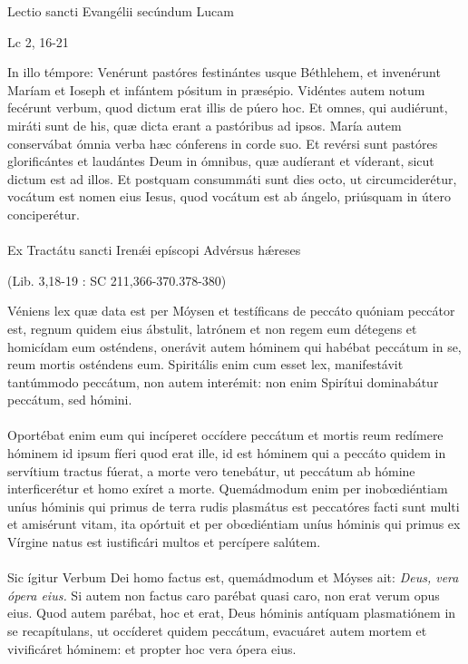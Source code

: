 \documentclass[options]{article}
\begin{document}
		Lectio sancti Evangélii secúndum Lucam
	\begin{flushright}
		Lc 2, 16-21
	\end{flushright}
In illo témpore:
Venérunt pastóres festinántes usque Béthlehem, et invenérunt Maríam et Ioseph et infántem pósitum in præsépio.
Vidéntes autem notum fecérunt verbum, quod dictum erat illis de púero hoc. Et omnes, qui audiérunt, miráti sunt de his, quæ dicta erant a pastóribus ad ipsos. María autem conservábat ómnia verba hæc cónferens in corde suo.
Et revérsi sunt pastóres glorificántes et laudántes Deum in ómnibus, quæ audíerant et víderant, sicut dictum est ad illos.
Et postquam consummáti sunt dies octo, ut circumciderétur, vocátum est nomen eius Iesus, quod vocátum est ab ángelo, priúsquam in útero conciperétur.\\
\\
Ex Tractátu sancti Iren\'{æ}i epíscopi Advérsus h\'{æ}reses
\begin{flushright}
	(Lib. 3,18-19 : SC 211,366-370.378-380)
\end{flushright}
Véniens lex quæ data est per Móysen et testíficans de peccáto quóniam peccátor est, regnum quidem eius ábstulit, latrónem et non regem eum détegens et homicídam eum osténdens, onerávit autem hóminem qui habébat peccátum in se, reum mortis osténdens eum. Spiritális enim cum esset lex, manifestávit tantúmmodo peccátum, non autem interémit: non enim Spirítui dominabátur peccátum, sed hómini.\\
\\
Oportébat enim eum qui incíperet occídere peccátum et mortis reum redímere hóminem id ipsum fíeri quod erat ille, id est hóminem qui a peccáto quidem in servítium tractus fúerat, a morte vero tenebátur, ut peccátum ab hómine interficerétur et homo exíret a morte. Quemádmodum enim per inobœdiéntiam uníus hóminis qui primus de terra rudis plasmátus est peccatóres facti sunt multi et amisérunt vitam, ita opórtuit et per obœdiéntiam uníus hóminis qui primus ex Vírgine natus est iustificári multos et percípere salútem.\\
\\
Sic ígitur Verbum Dei homo factus est, quemádmodum et Móyses ait: \emph{Deus, vera ópera eius.} Si autem non factus caro parébat quasi caro, non erat verum opus eius. Quod autem parébat, hoc et erat, Deus hóminis antíquam plasmatiónem in se recapítulans, ut occíderet quidem peccátum, evacuáret autem mortem et vivificáret hóminem: et propter hoc vera ópera eius.\\
\\
\end{document}
